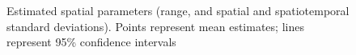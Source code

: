 \documentclass[
]{article}
\begin{document}
\begin{figure}


\caption{\label{fig-spatial-parameters}Estimated spatial parameters
(range, and spatial and spatiotemporal standard deviations). Points
represent mean estimates; lines represent 95\% confidence intervals}

\end{figure}%

\newpage
\end{document}

